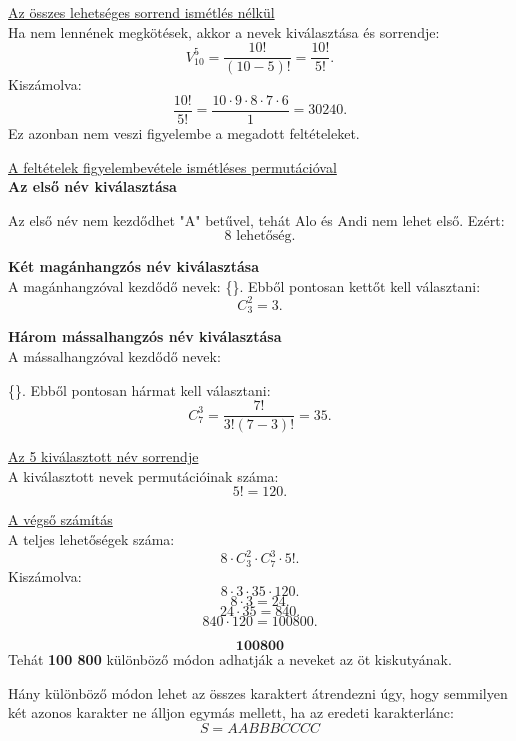 \begin{solution}

\underline{ Az összes lehetséges sorrend ismétlés nélkül}\\

Ha nem lennének megkötések, akkor a nevek kiválasztása és sorrendje:
\[
V_{10}^{5}=\frac{10!}{(10-5)!}=\frac{10!}{5!}.
\]
Kiszámolva: 
\[
\frac{10!}{5!}=\frac{10\cdot9\cdot8\cdot7\cdot6}{1}=30240.
\]
Ez azonban nem veszi figyelembe a megadott feltételeket.

\underline{A feltételek figyelembevétele ismétléses permutációval}\\

\textbf{Az első név kiválasztása}

Az első név nem kezdődhet "A" betűvel, tehát Alo és Andi nem lehet
első. Ezért: 
\[
8\text{ lehetőség.}
\]

\textbf{Két magánhangzós név kiválasztása}\\

A magánhangzóval kezdődő nevek: \{\}. Ebből
pontosan kettőt kell választani: 
\[
C_{3}^{2}=3.
\]

\textbf{Három mássalhangzós név kiválasztása}\\

A mássalhangzóval kezdődő nevek:

\{\}.
Ebből pontosan hármat kell választani: 
\[
C_{7}^{3}=\frac{7!}{3!(7-3)!}=35.
\]

\underline{Az 5 kiválasztott név sorrendje}\\

A kiválasztott nevek permutációinak száma: 
\[
5!=120.
\]

\underline{A végső számítás}\\

A teljes lehetőségek száma: 
\[
8\cdot C_{3}^{2}\cdot C_{7}^{3}\cdot5!.
\]
Kiszámolva: 
\[
8\cdot3\cdot35\cdot120.
\]
\[
8\cdot3=24.
\]
\[
24\cdot35=840.
\]
\[
840\cdot120=100800.
\]

\[
\mathbf{100800}
\]
Tehát \textbf{100 800} különböző módon adhatják a neveket az öt kiskutyának.
\end{solution}
\begin{extraproblem}
 Hány különböző módon lehet az összes karaktert átrendezni úgy, hogy
semmilyen két azonos karakter ne álljon egymás mellett, ha az eredeti
karakterlánc: 
\[
S=AABBBCCCC
\]
\end{extraproblem}

